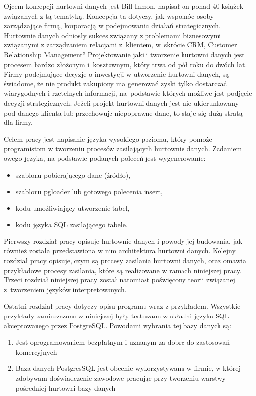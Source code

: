 
Ojcem koncepcji hurtowni danych jest Bill Inmon,
 napisał on ponad 40 książek związanych z tą tematyką.
Koncepcja ta dotyczy,
 jak wspomóc osoby zarządzające firmą,
 korporacją w podejmowaniu działań strategicznych.
Hurtownie danych odniosły sukces związany z problemami biznesowymi związanymi z zarządzaniem relacjami z~klientem,
 w~skrócie CRM, \ang{Customer Relationship Management}
Projektowanie jaki i tworzenie hurtowni danych jest procesem bardzo złożonym i~kosztownym,
 który trwa od pół roku do dwóch lat.
Firmy podejmujące decyzje o inwestycji w utworzenie hurtowni danych,
 są świadome, 
 że nie produkt zakupiony ma generować zyski tylko dostarczać wiarygodnych i rzetelnych informacji, 
 na~podstawie których możliwe jest podjęcie decyzji strategicznych. 
Jeżeli projekt hurtowni danych jest nie ukierunkowany pod danego klienta lub przechowuje niepoprawne dane, 
 to staje się dużą stratą dla firmy.\cite{TodMan}

Celem pracy jest napisanie języka wysokiego poziomu, 
 który pomoże programistom w tworzeniu procesów zasilających hurtownie danych.
 Zadaniem owego języka, na podstawie podanych poleceń jest wygenerowanie:

\begin{itemize}
 \item szablonu pobierającego dane (źródło),
 \item szablonu pgloader lub gotowego polecenia insert,
 \item kodu umożliwiający utworzenie tabel,
 \item kodu języka SQL zasilającego tabele.
\end{itemize}

Pierwszy rozdział pracy opisuje hurtownie danych i powody jej budowania,
 jak również została przedstawiona w nim architektura hurtowni danych.
Kolejny rozdział pracy opisuje, czym są procesy zasilania hurtowni danych, 
 oraz omawia przykładowe procesy zasilania, które są realizowane w ramach niniejszej pracy.
Trzeci rozdział niniejszej pracy został natomiast poświęcony teorii związanej 
z~tworzeniem języków interpretowanych.

Ostatni rozdział pracy dotyczy opisu programu wraz z przykładem.
 Wszystkie przykłady zamieszczone w niniejszej były testowane 
w składni języka SQL akceptowanego 
przez PostgreSQL.
Powodami wybrania tej bazy danych są:
\begin{enumerate}
 \item Jest oprogramowaniem bezpłatnym i uznanym za dobre do zastosowań komercyjnych
 \item Baza danych PostgresSQL jest obecnie wykorzystywana w firmie,
    w której zdobywam doświadczenie zawodowe pracując przy tworzeniu warstwy pośredniej hurtowni bazy danych
\end{enumerate}

